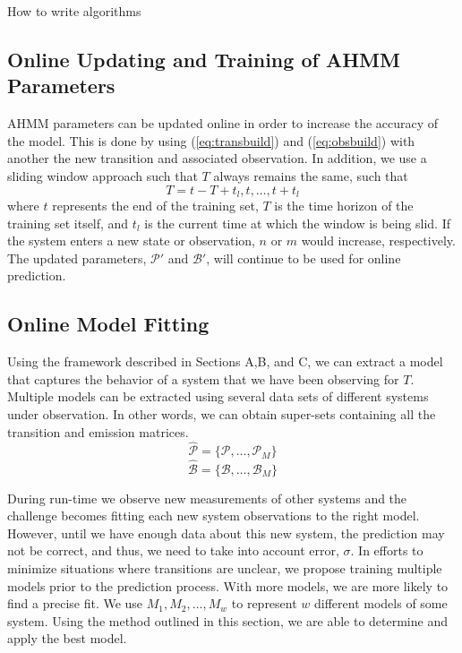 \documentclass[conference]{IEEEtran}
\begin{document}
\begin{algorithm}[H]
\SetAlgoLined
{}
 \caption{How to write algorithms}
\end{algorithm}


\subsection{Online Updating and Training of AHMM Parameters}
AHMM parameters can be updated online in order to increase the accuracy of the model. This is done by using (\ref{eq:transbuild}) and (\ref{eq:obsbuild}) with another the new transition and associated observation. In addition, we use a sliding window approach such that $T$ always remains the same, such that
\begin{equation}
 T = t-T+t_l,t,\ldots,t+t_l    
\end{equation}
where $t$ represents the end of the training set, $T$ is the time horizon of the training set itself, and $t_l$ is the current time at which the window is being slid. If the system enters a new state or observation, $n$ or $m$ would increase, respectively. The updated parameters, $\mathcal{P'}$ and $\mathcal{B'}$, will continue to be used for online prediction.

\subsection{Online Model Fitting}
Using the framework described in Sections A,B, and C,  we can extract a model that captures the behavior of a system that we have been observing for $T$. Multiple models can be extracted using several data sets of different systems under observation. In other words, we can obtain super-sets containing all the transition and emission matrices.
\begin{equation}
    \hat{\mathcal{P}} = \{\mathcal{P},\ldots,\mathcal{P}_M\}
\end{equation}
\begin{equation}
    \hat{\mathcal{B}} = \{\mathcal{B},\ldots,\mathcal{B}_M\}
\end{equation}

During run-time we observe new measurements of other systems and the challenge becomes fitting each new system observations to the right model. However, until we have enough data about this new system, the prediction may not be correct, and thus, we need to take into account error, $\sigma$. In efforts to minimize situations where transitions are unclear, we propose training multiple models prior to the prediction process. With more models, we are more likely to find a precise fit. We use $M_1,M_2,\ldots,M_w$ to represent $w$ different models of some system. Using the method outlined in this section, we are able to determine and apply the best model.
\end{document}
